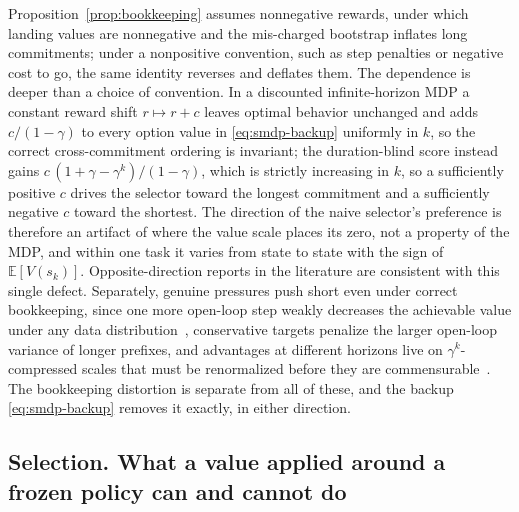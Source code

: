 \begin{remark}
\label{rem:sign}
Proposition~\ref{prop:bookkeeping} assumes nonnegative rewards, under which landing values are
nonnegative and the mis-charged bootstrap inflates long commitments; under a nonpositive
convention, such as step penalties or negative cost to go, the same identity reverses and deflates
them. The dependence is deeper than a choice of convention. In a discounted infinite-horizon MDP a
constant reward shift $r\mapsto r+c$ leaves optimal behavior unchanged and adds $c/(1-\gamma)$ to
every option value in \eqref{eq:smdp-backup} uniformly in $k$, so the correct cross-commitment
ordering is invariant; the duration-blind score instead gains $c\,(1+\gamma-\gamma^{k})/(1-\gamma)$,
which is strictly increasing in $k$, so a sufficiently positive $c$ drives the selector toward the
longest commitment and a sufficiently negative $c$ toward the shortest. The direction of the naive
selector's preference is therefore an artifact of where the value scale places its zero, not a
property of the MDP, and within one task it varies from state to state with the sign of
$\mathbb E[V(s_k)]$. Opposite-direction reports in the literature are consistent with this single
defect. Separately, genuine pressures push short even under correct bookkeeping, since one more
open-loop step weakly decreases the achievable value under any data distribution~\citep{dqc},
conservative targets penalize the larger open-loop variance of longer prefixes, and advantages at
different horizons live on $\gamma^{k}$-compressed scales that must be renormalized before they
are commensurable~\citep{aqc}. The bookkeeping distortion is separate from all of these, and the
backup \eqref{eq:smdp-backup} removes it exactly, in either direction.
\end{remark}

\subsection{Selection. What a value applied around a frozen policy can and cannot do}
\label{app:selection}

